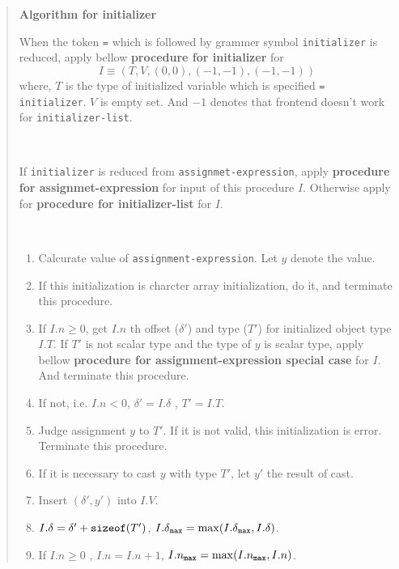 \begin{quotation}
{\bf Algorithm for initializer}
\begin{description}
When the token {\tt{=}} which is followed by
grammer symbol {\tt{initializer}} is reduced,
apply bellow {\bf procedure for initializer} for
\[
I \equiv (T,V,(0,0),(-1,-1),(-1,-1))
\]
where, $T$ is the type of initialized variable
which is specified {\tt{= initializer}}.
$V$ is empty set. And $-1$ denotes that
frontend doesn't work for {\tt{initializer-list}}.

\item[procedure for initializer]

\

If {\tt{initializer}} is reduced from {\tt{assignmet-expression}},
apply {\bf procedure for assignmet-expression} for input of this
procedure $I$. Otherwise apply for
{\bf procedure for initializer-list} for $I$.




\item[procedure for assignmet-expression]

\

\begin{enumerate}
\item Calcurate value of {\tt assignment-expression}. Let $y$ denote
      the value. 
\item \label{initializer010}
      If this initialization is charcter array initialization,
      do it, and terminate this procedure.
\item \label{initializer004}
      If $I.n \ge 0$, get $I.n$ th offset (${\delta}'$) and type ($T'$)
      for initialized object type $I.T$.
      If $T'$ is not scalar type and the type of $y$ is scalar type,
      apply bellow {\bf procedure for assignment-expression special case}
      for $I$. And terminate this procedure. 
\item If not, i.e. $I.n < 0$,
      ${\delta}' = I.\delta$ , $T' = I.T$.
\item Judge assignment $y$ to $T'$. If it is not valid, this
      initialization is error. Terminate this procedure.
\item If it is necessary to cast $y$ with type $T'$,
      let $y'$ the result of cast.
\item Insert $({\delta}', y')$ into $I.V$.
\item $I.\delta = {\delta}' + {\tt sizeof}(T')$,
      ${I.\delta}_{\tt{max}} = \max({I.\delta}_{\tt{max}}, I.{\delta})$.
\item If $I.n \ge 0$ , $I.n = I.n + 1$,
       $I.n_{\tt{max}} = \max(I.n_{\tt{max}}, I.n)$.
\end{enumerate}


\end{description}
\end{quotation}
